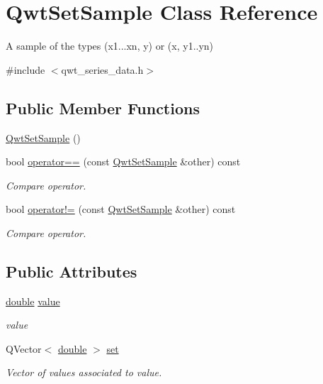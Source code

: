\hypertarget{class_qwt_set_sample}{\section{Qwt\-Set\-Sample Class Reference}
\label{class_qwt_set_sample}
}


A sample of the types (x1...xn, y) or (x, y1..yn)  




{\ttfamily \#include $<$qwt\-\_\-series\-\_\-data.\-h$>$}

\subsection*{Public Member Functions}
\begin{DoxyCompactItemize}
\item 
\hyperlink{class_qwt_set_sample_af506c3484b65d5de2b6042755066ff81}{Qwt\-Set\-Sample} ()
\item 
bool \hyperlink{class_qwt_set_sample_a76859b776c7501b04c50197fe9e6c97e}{operator==} (const \hyperlink{class_qwt_set_sample}{Qwt\-Set\-Sample} \&other) const 
\begin{DoxyCompactList}\small\item\em Compare operator. \end{DoxyCompactList}\item 
bool \hyperlink{class_qwt_set_sample_a0b96a0b525bbf4aab51a406502c4734c}{operator!=} (const \hyperlink{class_qwt_set_sample}{Qwt\-Set\-Sample} \&other) const 
\begin{DoxyCompactList}\small\item\em Compare operator. \end{DoxyCompactList}\end{DoxyCompactItemize}
\subsection*{Public Attributes}
\begin{DoxyCompactItemize}
\item 
\hyperlink{_super_l_u_support_8h_a8956b2b9f49bf918deed98379d159ca7}{double} \hyperlink{class_qwt_set_sample_a5bff5286dddfa1f2070da64fe619859f}{value}
\begin{DoxyCompactList}\small\item\em value \end{DoxyCompactList}\item 
Q\-Vector$<$ \hyperlink{_super_l_u_support_8h_a8956b2b9f49bf918deed98379d159ca7}{double} $>$ \hyperlink{class_qwt_set_sample_af05cfa9fc52e7798f6594ba1bbbcd16b}{set}
\begin{DoxyCompactList}\small\item\em Vector of values associated to value. \end{DoxyCompactList}\end{DoxyCompactItemize}


